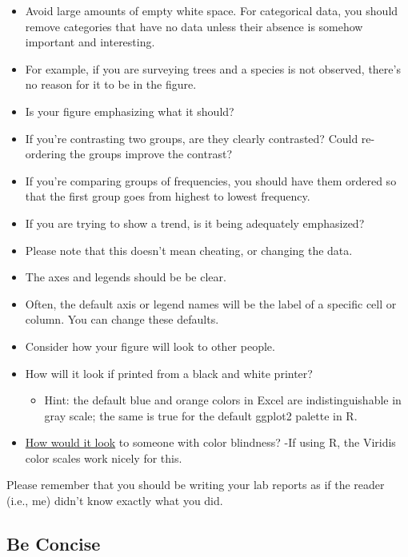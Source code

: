 \documentclass[]{book}
\providecommand{\tightlist}{%
  \setlength{\itemsep}{0pt}\setlength{\parskip}{0pt}}
\begin{document}
\begin{itemize}
\tightlist
\item
  Avoid large amounts of empty white space. For categorical data, you
  should remove categories that have no data unless their absence is
  somehow important and interesting.
\item
  For example, if you are surveying trees and a species is not observed,
  there's no reason for it to be in the figure.
\item
  Is your figure emphasizing what it should?
\item
  If you're contrasting two groups, are they clearly contrasted? Could
  re-ordering the groups improve the contrast?
\item
  If you're comparing groups of frequencies, you should have them
  ordered so that the first group goes from highest to lowest frequency.
\item
  If you are trying to show a trend, is it being adequately emphasized?
\item
  Please note that this doesn't mean cheating, or changing the data.
\item
  The axes and legends should be be clear.
\item
  Often, the default axis or legend names will be the label of a
  specific cell or column. You can change these defaults.
\item
  Consider how your figure will look to other people.
\item
  How will it look if printed from a black and white printer?

  \begin{itemize}
  \tightlist
  \item
    Hint: the default blue and orange colors in Excel are
    indistinguishable in gray scale; the same is true for the default
    ggplot2 palette in R.
  \end{itemize}
\item
  \href{https://venngage.com/blog/color-blind-friendly-palette/}{How
  would it look} to someone with color blindness? -If using R, the
  Viridis color scales work nicely for this.
\end{itemize}

Please remember that you should be writing your lab reports as if the
reader (i.e., me) didn't know exactly what you did.

\subsection{Be Concise}\label{be-concise-1}
\end{document}
